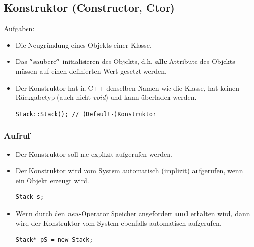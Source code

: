 \subsection{Konstruktor (Constructor, Ctor)}
Aufgaben:
\begin{itemize}
	\item Die Neugründung eines Objekts einer Klasse.
	\item Das $"$saubere$"$ initialisieren des Objekts, d.h. \textbf{alle} Attribute des Objekts müssen auf einen definierten Wert gesetzt werden.
	\item Der Konstruktor hat in C++ denselben Namen wie die Klasse, hat keinen Rückgabetyp (auch nicht \emph{void}) und kann überladen werden.\\
	\vspace{-\baselineskip}
	\begin{minipage}{0.55\linewidth}
\begin{lstlisting}
Stack::Stack();	// (Default-)Konstruktor
\end{lstlisting}
	\end{minipage}
\end{itemize}

\subsubsection{Aufruf}
\label{sec:aufruf}
\begin{itemize}
	\item Der Konstruktor soll nie explizit aufgerufen werden.
	\item Der Konstruktor wird vom System automatisch (implizit) aufgerufen, wenn ein Objekt erzeugt wird.\\
	\vspace{-\baselineskip}
	\begin{minipage}{0.15\linewidth}
\begin{lstlisting}
Stack s;
\end{lstlisting}
	\end{minipage}
	\item Wenn durch den \emph{new}-Operator Speicher angefordert \textbf{und} erhalten wird, dann wird der Konstruktor vom System ebenfalls automatisch aufgerufen.\\
	\vspace{-\baselineskip}
	\begin{minipage}{0.3\linewidth}
\begin{lstlisting}
Stack* pS = new Stack;
\end{lstlisting}
	\end{minipage}
\end{itemize}

